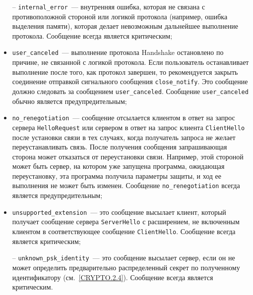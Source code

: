 \begin{itemize}
\item[--] 
\lstinline{internal_error}~--- внутренняя ошибка, которая не 
связана  с противоположной стороной или логикой протокола (например, ошибка 
выделения памяти), которая делает невозможным дальнейшее выполнение 
протокола. Сообщение всегда является критическим; 

\item[--]
\lstinline{user_canceled}~--- выполнение протокола Handshake 
остановлено по причине, не связанной с логикой протокола. Если 
пользователь останавливает выполнение после того, как протокол завершен, 
то рекомендуется закрыть соединение отправкой сигнального сообщения 
\lstinline{close_notify}. Это сообщение должно следовать за сообщением 
\lstinline{user_canceled}. Сообщение \lstinline{user_canceled} обычно 
является предупредительным;  

\item[--]
\lstinline{no_renegotiation}~--- сообщение отсылается клиентом в 
ответ на запрос сервера \lstinline{HelloRequest} или сервером в ответ на запрос 
клиента \lstinline{ClientHello} после установки связи в тех случаях, когда получатель 
запроса не желает переустанавливать связь. После получения сообщения 
запрашивающая сторона может отказаться от переустановки связи. Например, 
этой стороной может быть  сервер, на котором уже запущена программа, 
ожидающая переустановку, эта программа получила параметры защиты, и ход ее 
выполнения не может быть изменен. Сообщение \lstinline{no_renegotiation} всегда 
является предупредительным; 

\item[--] 
\lstinline{unsupported_extension}~--- это сообщение высылает клиент, 
который получает сообщение сервера \lstinline{ServerHello} с расширением, не 
включенным клиентом в соответствующее сообщение \lstinline{ClientHello}. 
Сообщение всегда является критическим; 

\item[--] 
\lstinline{unknown_psk_identity}~--- это сообщение высылает сервер, 
если он не может определить предварительно распределенный секрет по 
полученному идентификатору (см.~\ref{CRYPTO.2.4}). Сообщение всегда 
является критическим. 
\end{itemize}


                                 